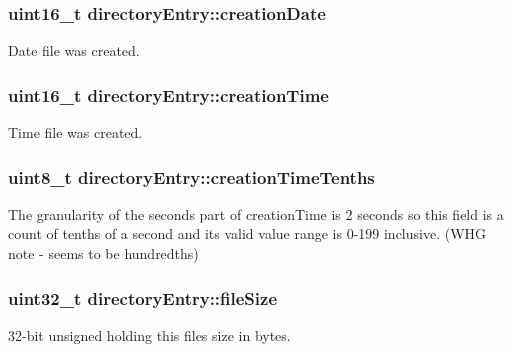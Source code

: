 \subsubsection[{creation\+Date}]{\setlength{\rightskip}{0pt plus 5cm}uint16\+\_\+t directory\+Entry\+::creation\+Date}\label{structdirectory_entry_a7b43372794655fe6604d3c17c02302fe}
Date file was created. \hypertarget{structdirectory_entry_a622bfa70c2cd9006108d7473d737a953}{}
\subsubsection[{creation\+Time}]{\setlength{\rightskip}{0pt plus 5cm}uint16\+\_\+t directory\+Entry\+::creation\+Time}\label{structdirectory_entry_a622bfa70c2cd9006108d7473d737a953}
Time file was created. \hypertarget{structdirectory_entry_aa5e1ce5b411b88f005b28a3e7c7c5af6}{}
\subsubsection[{creation\+Time\+Tenths}]{\setlength{\rightskip}{0pt plus 5cm}uint8\+\_\+t directory\+Entry\+::creation\+Time\+Tenths}\label{structdirectory_entry_aa5e1ce5b411b88f005b28a3e7c7c5af6}
The granularity of the seconds part of creation\+Time is 2 seconds so this field is a count of tenths of a second and its valid value range is 0-\/199 inclusive. (W\+H\+G note -\/ seems to be hundredths) \hypertarget{structdirectory_entry_ac2445d99b50f925f662952e0ccd26a02}{}
\subsubsection[{file\+Size}]{\setlength{\rightskip}{0pt plus 5cm}uint32\+\_\+t directory\+Entry\+::file\+Size}\label{structdirectory_entry_ac2445d99b50f925f662952e0ccd26a02}
32-\/bit unsigned holding this file\textquotesingle{}s size in bytes. \hypertarget{structdirectory_entry_a3b492598b2b05e8425d2a500443613bd}{}
